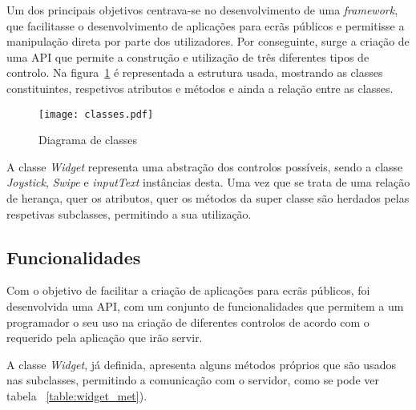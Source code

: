 Um dos principais objetivos centrava-se no desenvolvimento de uma \textit{framework}, que facilitasse o desenvolvimento de aplicações para ecrãs públicos e permitisse a manipulação direta por parte dos utilizadores. Por conseguinte, surge a criação de uma API que permite a construção e utilização de três diferentes tipos de controlo.
Na figura~\ref{fig:classes} é representada a estrutura usada, mostrando as classes constituintes, respetivos atributos e métodos e ainda a relação entre as classes.

\begin{figure}[ht]
\centering
\texttt{[image: classes.pdf]}
\caption[Diagrama de Classes] {Diagrama de classes}
\label{fig:classes}
\end{figure}

A classe \textit{Widget} representa uma abstração dos controlos possíveis, sendo a classe \textit{Joystick}, \textit{Swipe} e \textit{inputText} instâncias desta. Uma vez que se trata de uma relação de herança, quer os atributos, quer os métodos da super classe são herdados pelas respetivas subclasses, permitindo a sua utilização.

\subsection{Funcionalidades}

	Com o objetivo de facilitar a criação de aplicações para ecrãs públicos, foi desenvolvida uma API, com um conjunto de funcionalidades que permitem a um programador o seu uso na criação de diferentes controlos de acordo com o requerido pela aplicação que irão servir.

	A classe \textit{Widget}, já definida, apresenta alguns métodos próprios que são usados nas subclasses, permitindo a comunicação com o servidor, como se pode ver tabela ~\ref{table:widget_met}).

